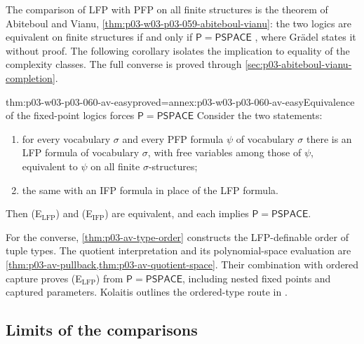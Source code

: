 The comparison of LFP with PFP on all finite structures is the theorem of
Abiteboul and Vianu, \cref{thm:p03-w03-p03-059-abiteboul-vianu}: the two
logics are equivalent on finite structures if and only if
\(\mathsf P=\mathsf{PSPACE}\) \cite[Thm.~3.3.56,
p.~180]{Gradel2007FMTDescriptiveChapter}, where Gr\"adel states it without
proof. The following corollary isolates the implication to equality
of the complexity classes. The full converse is proved through
\cref{sec:p03-abiteboul-vianu-completion}.

\begin{hbcorollary}{thm:p03-w03-p03-060-av-easy}{proved=annex:p03-w03-p03-060-av-easy}{Equivalence of the fixed-point logics forces \(\mathsf P=\mathsf{PSPACE}\)}
Consider the two statements:
\begin{enumerate}
\item[(E\(_{\mathrm{LFP}}\))] for every vocabulary \(\sigma\) and every PFP
      formula \(\psi\) of vocabulary \(\sigma\) there is an LFP formula of
      vocabulary \(\sigma\), with free variables among those of \(\psi\),
      equivalent to \(\psi\) on all finite \(\sigma\)-structures;
\item[(E\(_{\mathrm{IFP}}\))] the same with an IFP formula in place of the
      LFP formula.
\end{enumerate}
Then (E\(_{\mathrm{LFP}}\)) and (E\(_{\mathrm{IFP}}\)) are equivalent, and
each implies \(\mathsf P=\mathsf{PSPACE}\).
\end{hbcorollary}

For the converse, \cref{thm:p03-av-type-order} constructs the
LFP-definable order of tuple types. The quotient interpretation and
its polynomial-space evaluation are
\cref{thm:p03-av-pullback,thm:p03-av-quotient-space}. Their combination
with ordered capture proves (E\(_{\mathrm{LFP}}\)) from
\(\mathsf P=\mathsf{PSPACE}\), including nested fixed points and
captured parameters. Kolaitis outlines the ordered-type route in
\cite[Thms.~7.24 and~7.25, p.~68]{Kolaitis2003ExpressivePowerNotes}.



\subsection{Limits of the comparisons}

